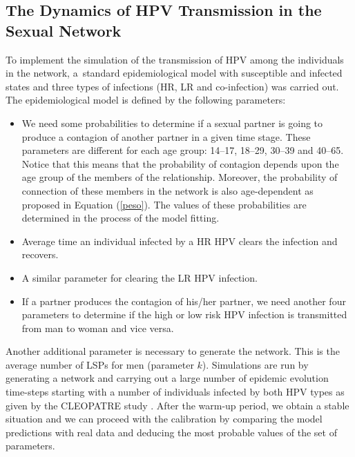 \subsection{The Dynamics of HPV Transmission in the Sexual Network}

To implement the simulation of the transmission of HPV among the individuals in the network, a~standard epidemiological model with susceptible and infected states and three types of infections (HR, LR and co-infection) was carried out.
The epidemiological model is defined by the following parameters:

\begin{itemize}[leftmargin=*,labelsep=5mm]
\item We need some probabilities to determine if a sexual partner is going to produce a contagion of another partner in a given time stage. These parameters are different for each age group:	
 14--17, 18--29, 30--39 and 40--65. Notice that this means that the probability of contagion depends upon the age group of the members of the relationship. Moreover, the probability of connection of these members in the network is also age-dependent
as proposed in Equation (\ref{peso}). The values of these probabilities are determined in the process of the model fitting.
\item Average time an individual infected by a HR HPV clears the infection and recovers.
\item A similar parameter for clearing the LR HPV infection.
\item If a partner produces the contagion of his/her partner, we need another four parameters to determine if the high or low risk HPV infection is transmitted from man to woman and vice versa. 
\end{itemize}

Another additional parameter is necessary to generate the network. This is the average number of LSPs for men (parameter $k$). Simulations are run by generating a network and carrying out a large number of epidemic evolution time-steps starting with a number of individuals infected by both HPV types as given by the CLEOPATRE study \cite{CLEOPATRE}.
After the warm-up period, we obtain a stable situation and we can proceed with the calibration by comparing the model predictions with real data and deducing the most probable values of the set of parameters.

